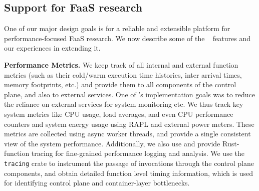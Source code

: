 


\subsection{Support for FaaS research}
\label{sec:impl:support}

One of our major design goals is for a reliable and extensible platform for performance-focused FaaS research.
We now describe some of the \sysname~ features and our experiences in extending it.


\noindent \textbf{Performance Metrics.}
We keep track of all internal and external function metrics (such as their cold/warm execution time histories, inter arrival times, memory footprints, etc.) and provide them to all components of the control plane, and also to external services.
%
One of \sysname's implementation goals was to reduce the reliance on external services for system monitoring etc.
We thus track key system metrics like CPU usage, load averages, and even CPU performance counters and system energy usage using RAPL and external power meters.
These metrics are collected using async worker threads, and provide a single consistent view of the system performance.
%
Additionally, we also use and provide Rust-function tracing for fine-grained performance logging and analysis.
We use the \texttt{tracing} crate to instrument the passage of invocations through the control plane components, and obtain detailed function level timing information, which is used for identifying control plane and container-layer bottlenecks. 


